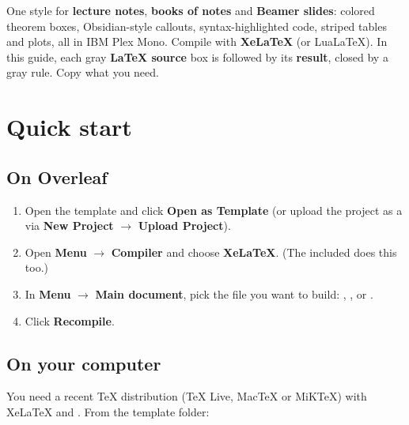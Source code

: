 \documentclass[11pt]{article}
\begin{document}

\begin{tldr}
One style for \textbf{lecture notes}, \textbf{books of notes} and \textbf{Beamer
slides}: colored theorem boxes, Obsidian-style callouts, syntax-highlighted code,
striped tables and plots, all in IBM Plex Mono. Compile with \textbf{XeLaTeX} (or
LuaLaTeX). In this guide, each gray \textbf{LaTeX source} box is followed by its
\textbf{result}, closed by a gray rule. Copy what you need.
\end{tldr}

\tableofcontents

\section{Quick start}\label{sec:start}

\subsection{On Overleaf}

\begin{enumerate}
  \item Open the template and click \textbf{Open as Template} (or upload the
        project as a  via \textbf{New Project} $\to$ \textbf{Upload Project}).
  \item Open \textbf{Menu} $\to$ \textbf{Compiler} and choose \textbf{XeLaTeX}.
        (The included  does this too.)
  \item In \textbf{Menu} $\to$ \textbf{Main document}, pick the file you want to
        build: , ,  or .
  \item Click \textbf{Recompile}.
\end{enumerate}

\subsection{On your computer}

You need a recent TeX distribution (TeX Live, MacTeX or MiKTeX) with XeLaTeX and
. From the template folder:

\end{document}
